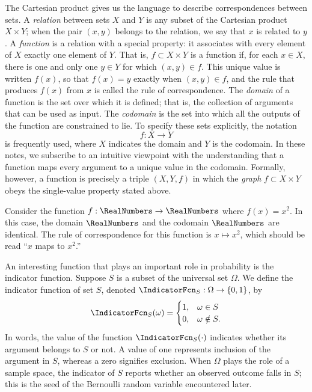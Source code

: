 The Cartesian product gives us the language to describe correspondences between sets.
A \emph{relation} between sets $X$ and $Y$ is any subset of the Cartesian product $X \times Y$;
when the pair $(x, y)$ belongs to the relation, we say that $x$ is related to $y$.
A \emph{function} is a relation with a special property: it associates with every element of $X$ exactly one element of $Y$.
That is, $f \subset X \times Y$ is a function if, for each $x \in X$, there is one and only one $y \in Y$ for which $(x, y) \in f$.
This unique value is written $f(x)$, so that $f(x) = y$ exactly when $(x, y) \in f$, and the rule that produces $f(x)$ from $x$ is called the rule of correspondence.
The \emph{domain} of a function is the set over which it is defined; that is, the collection of arguments that can be used as input.
The \emph{codomain} is the set into which all the outputs of the function are constrained to lie.
To specify these sets explicitly, the notation
\begin{equation*}
f: X \rightarrow Y
\end{equation*}
is frequently used, where $X$ indicates the domain and $Y$ is the codomain.
In these notes, we subscribe to an intuitive viewpoint with the understanding that a function maps every argument to a unique value in the codomain.
Formally, however, a function is precisely a triple $(X, Y, f)$ in which the \emph{graph} $f \subset X \times Y$ obeys the single-value property stated above.

\begin{example}
Consider the function $f: \RealNumbers \rightarrow \RealNumbers$ where $f(x) = x^2$.
In this case, the domain $\RealNumbers$ and the codomain $\RealNumbers$ are identical.
The rule of correspondence for this function is $x \mapsto x^2$, which should be read ``$x$ maps to $x^2$.''
\end{example}

\begin{example}
An interesting function that plays an important role in probability is the indicator function.
Suppose $S$ is a subset of the universal set $\Omega$.
We define the indicator function of set $S$, denoted $\IndicatorFcn_S: \Omega \rightarrow \{ 0, 1 \}$, by
\begin{equation*}
\IndicatorFcn_S (\omega) = \begin{cases} 1, & \omega \in S\\
0, & \omega \notin S . \end{cases}
\end{equation*}
In words, the value of the function $\IndicatorFcn_S (\cdot)$ indicates whether its argument belongs to $S$ or not.
A value of one represents inclusion of the argument in $S$, whereas a zero signifies exclusion.
When $\Omega$ plays the role of a sample space, the indicator of $S$ reports whether an observed outcome falls in $S$; this is the seed of the Bernoulli random variable encountered later.
\end{example}

